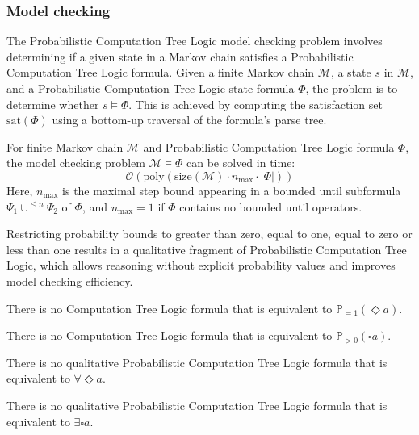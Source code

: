 \subsubsection{Model checking}
The Probabilistic Computation Tree Logic model checking problem involves determining if a given state in a Markov chain satisfies a Probabilistic Computation Tree Logic formula. 
Given a finite Markov chain $\mathcal{M}$, a state $s$ in $\mathcal{M}$, and a Probabilistic Computation Tree Logic state formula $\Phi$, the problem is to determine whether $s \models \Phi$.
This is achieved by computing the satisfaction set $\text{sat}(\Phi)$ using a bottom-up traversal of the formula's parse tree.
\begin{theorem}
    For finite Markov chain $\mathcal{M}$ and Probabilistic Computation Tree Logic formula $\Phi$, the model checking problem $\mathcal{M} \models \Phi$ can be solved in time: 
    \[\mathcal{O}\left(\text{poly}\left(\text{size}\left(\mathcal{M}\right)\cdot n_{\max}\cdot\left\lvert \Phi\right\rvert\right)\right)\]
    Here, $n_{\max}$ is the maximal step bound appearing in a bounded until subformula $\Psi_1\cup^{\leq n}\Psi_2$ of $\Phi$, and $n_{\max}=1$ if $\Phi$ contains no bounded until operators.
\end{theorem}
Restricting probability bounds to greater than zero, equal to one, equal to zero or less than one results in a qualitative fragment of Probabilistic Computation Tree Logic, which allows reasoning without explicit probability values and improves model checking efficiency.
\begin{property}
    There is no Computation Tree Logic formula that is equivalent to $\mathbb{P}_{=1}(\Diamond a)$.
\end{property}
\begin{property}
    There is no Computation Tree Logic formula that is equivalent to $\mathbb{P}_{>0}(\square a)$.
\end{property}
\begin{property}
    There is no qualitative Probabilistic Computation Tree Logic formula that is equivalent to $\forall\Diamond a$. 
\end{property}
\begin{property}
    There is no qualitative Probabilistic Computation Tree Logic formula that is equivalent to $\exists\square a$.
\end{property}

